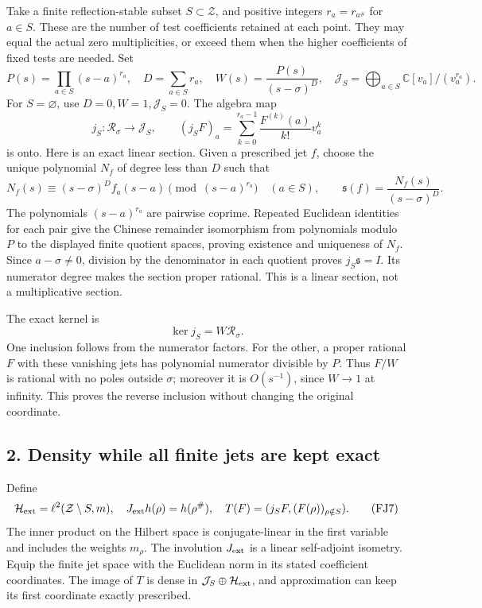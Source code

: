\documentclass[
  10pt,
  a4paper,
]{article}
\begin{document}
Take a finite reflection-stable subset \(S\subset\mathcal Z\), and
positive integers \(r_a=r_{a^\#}\) for \(a\in S\). These are the number
of test coefficients retained at each point. They may equal the actual
zero multiplicities, or exceed them when the higher coefficients of
fixed tests are needed. Set \[
P(s)=\prod_{a\in S}(s-a)^{r_a},\quad D=\sum_{a\in S}r_a,
\quad W(s)=\frac{P(s)}{(s-\sigma)^D},\quad
\mathcal J_S=\bigoplus_{a\in S}\mathbb C[v_a]/(v_a^{r_a}).
\tag{FJ3}
\] For \(S=\varnothing\), use \(D=0,W=1,\mathcal J_S=0\). The algebra
map \[
j_S:\mathcal R_\sigma\longrightarrow\mathcal J_S,
\qquad (j_SF)_a=\sum_{k=0}^{r_a-1}\frac{F^{(k)}(a)}{k!}v_a^k
\tag{FJ4}
\] is onto. Here is an exact linear section. Given a prescribed jet
\(f\), choose the unique polynomial \(N_f\) of degree less than \(D\)
such that \[
N_f(s)\equiv (s-\sigma)^D f_a(s-a)
 \pmod{(s-a)^{r_a}}\quad(a\in S),\qquad
\mathfrak s(f)=\frac{N_f(s)}{(s-\sigma)^D}.
\tag{FJ5}
\] The polynomials \((s-a)^{r_a}\) are pairwise coprime. Repeated
Euclidean identities for each pair give the Chinese remainder
isomorphism from polynomials modulo \(P\) to the displayed finite
quotient spaces, proving existence and uniqueness of \(N_f\). Since
\(a-\sigma\ne0\), division by the denominator in each quotient proves
\(j_S\mathfrak s=I\). Its numerator degree makes the section proper
rational. This is a linear section, not a multiplicative section.

The exact kernel is \[
\ker j_S=W\mathcal R_\sigma.
\tag{FJ6}
\] One inclusion follows from the numerator factors. For the other, a
proper rational \(F\) with these vanishing jets has polynomial numerator
divisible by \(P\). Thus \(F/W\) is rational with no poles outside
\(\sigma\); moreover it is \(O(s^{-1})\), since \(W\to1\) at infinity.
This proves the reverse inclusion without changing the original
coordinate.

\subsection{2. Density while all finite jets are kept
exact}\label{density-while-all-finite-jets-are-kept-exact}

Define \[
\mathcal H_{\rm ext}=\ell^2(\mathcal Z\setminus S,m),\quad
J_{\rm ext}h(\rho)=h(\rho^\#),\quad
T(F)=(j_SF,(F(\rho))_{\rho\notin S}).
\tag{FJ7}
\] The inner product on the Hilbert space is conjugate-linear in the
first variable and includes the weights \(m_\rho\). The involution
\(J_{\rm ext}\) is a linear self-adjoint isometry. Equip the finite jet
space with the Euclidean norm in its stated coefficient coordinates. The
image of \(T\) is dense in \(\mathcal J_S\oplus\mathcal H_{\rm ext}\),
and approximation can keep its first coordinate exactly prescribed.
\end{document}
